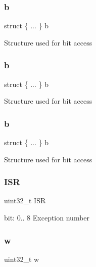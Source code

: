 \subsubsection{\texorpdfstring{b}{b}\hspace{0.1cm}{\footnotesize\ttfamily [2/4]}}
{\footnotesize\ttfamily struct \{ ... \}   b}

Structure used for bit access \mbox{\label{union_i_p_s_r___type_ac424c5b49a721a7dbf69205402156fc9}} 
\subsubsection{\texorpdfstring{b}{b}\hspace{0.1cm}{\footnotesize\ttfamily [3/4]}}
{\footnotesize\ttfamily struct \{ ... \}   b}

Structure used for bit access \mbox{\label{union_i_p_s_r___type_a3758147356a15906221a5625a27d9048}} 
\subsubsection{\texorpdfstring{b}{b}\hspace{0.1cm}{\footnotesize\ttfamily [4/4]}}
{\footnotesize\ttfamily struct \{ ... \}   b}

Structure used for bit access \mbox{\label{union_i_p_s_r___type_ad502ba7dbb2aab5f87c782b28f02622d}} 
\subsubsection{\texorpdfstring{ISR}{ISR}}
{\footnotesize\ttfamily uint32\+\_\+t I\+SR}

bit\+: 0.. 8 Exception number \mbox{\label{union_i_p_s_r___type_ad0fb62e7a08e70fc5e0a76b67809f84b}} 
\subsubsection{\texorpdfstring{w}{w}}
{\footnotesize\ttfamily uint32\+\_\+t w}

